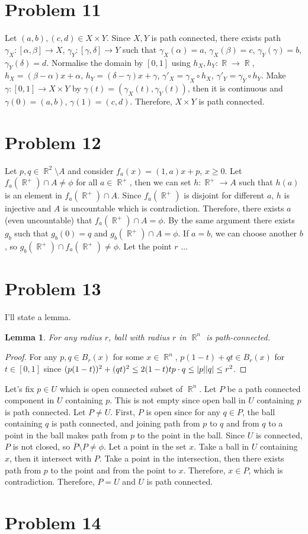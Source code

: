 \documentclass{article}
\DeclareMathOperator{\rr}{\mathbb{R}}
\DeclarePairedDelimiter\abs{\lvert}{\rvert}%
\newtheorem{lemma}{Lemma}
\begin{document}
\section*{Problem 11}
Let $(a,b),(c,d)\in X\times Y$. Since $X,Y$ is path connected, there exists path $\gamma_X:[\alpha,\beta]\rightarrow X$, $\gamma_Y:[\gamma, \delta]\rightarrow Y$ such that $\gamma_X(\alpha)=a$, $\gamma_X(\beta)=c$, $\gamma_Y(\gamma)=b$, $\gamma_Y(\delta)=d$. Normalise the domain by $[0,1]$ using $h_X, h_Y:\rr\rightarrow \rr$, $h_X=(\beta-\alpha)x+\alpha$, $h_Y=(\delta-\gamma)x+\gamma$, $\gamma'_X=\gamma_X\circ h_X$, $\gamma'_Y=\gamma_Y\circ h_Y$. Make $\gamma:[0, 1]\rightarrow X\times Y$ by $\gamma(t)=(\gamma_X(t), \gamma_Y(t))$, then it is continuous and $\gamma(0)=(a,b)$, $\gamma(1)=(c,d)$. Therefore, $X\times Y$ is path connected.
\section*{Problem 12}
Let $p,q\in \rr^2\setminus A$ and consider $f_a(x)=(1, a)x+p$, $x\geq 0$. Let $f_a(\rr^+)\cap A\neq \phi$ for all $a\in \rr^+$, then we can set $h:\rr^+\rightarrow A$ such that $h(a)$ is an element in $f_a(\rr^+)\cap A$. Since $f_a(\rr^+)$ is disjoint for different $a$, $h$ is injective and $A$ is uncountable which is contradiction. Therefore, there exists $a$ (even uncountable) that $f_a(\rr^+)\cap A=\phi$. By the same argument there exists $g_b$ such that $g_b(0)=q$ and $g_b(\rr^+)\cap A=\phi$. If $a=b$, we can choose another $b$, so $g_b(\rr^+)\cap f_a(\rr^+)\neq\phi$. Let the point $r$ ...
\section*{Problem 13}
I'll state a lemma.
\begin{lemma}
For any radius $r$, ball with radius $r$ in $\rr^n$ is path-connected.
\end{lemma}
\begin{proof}
For any $p,q\in B_r(x)$ for some $x\in \rr^n$, $p(1-t)+qt\in B_r(x)$ for $t\in [0,1]$ since $(p(1-t))^2+(qt)^2\leq 2 (1-t)tp\cdot q\leq \abs{p}\abs{q}\leq r^2$.
\end{proof}
Let's fix $p\in U$ which is open connected subset of $\rr^n$. Let $P$ be a path connected component in $U$ containing $p$. This is not empty since open ball in $U$ containing $p$ is path connected. Let $P\neq U$. First, $P$ is open since for any $q\in P$, the ball containing $q$ is path connected, and joining path from $p$ to $q$ and from $q$ to a point in the ball makes path from $p$ to the point in the ball. Since $U$ is connected, $P$ is not closed, so $\overline{P}\setminus P\neq \phi$. Let a point in the set $x$. Take a ball in $U$ containing $x$, then it intersect with $P$. Take a point in the intersection, then there exists path from $p$ to the point and from the point to $x$. Therefore, $x\in P$, which is contradiction. Therefore, $P=U$ and $U$ is path connected.
\section*{Problem 14}
\end{document}
